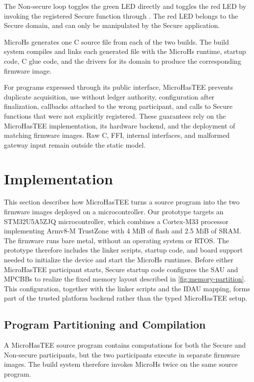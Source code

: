 \documentclass[sigconf]{acmart}
\begin{document}
The Non-secure loop toggles the green LED directly and toggles the red LED by invoking the registered Secure function through .
The red LED belongs to the Secure domain, and can only be manipulated by the Secure application.

MicroHs generates one C source file from each of the two builds.
The build system compiles and links each generated file with the MicroHs runtime, startup code, C glue code, and the drivers for its domain to produce the corresponding firmware image.

For programs expressed through its public interface, MicroHasTEE prevents duplicate acquisition, use without ledger authority, configuration after finalization, callbacks attached to the wrong participant, and calls to Secure functions that were not explicitly registered.
These guarantees rely on the MicroHasTEE implementation, its hardware backend, and the deployment of matching firmware images.
Raw C, FFI, internal interfaces, and malformed gateway input remain outside the static model.

\section{Implementation}
\label{sec:implementation}

This section describes how MicroHasTEE turns a source program into the two firmware images deployed on a microcontroller.
Our prototype targets an STM32U5A5ZJQ microcontroller, which combines a Cortex-M33 processor implementing Armv8-M TrustZone with 4 MiB of flash and 2.5 MiB of SRAM.
The firmware runs bare metal, without an operating system or RTOS.
The prototype therefore includes the linker scripts, startup code, and board support needed to initialize the device and start the MicroHs runtimes.
Before either MicroHasTEE participant starts, Secure startup code configures the SAU and MPCBBs to realize the fixed memory layout described in \cref{fig:memory-partition}.
This configuration, together with the linker scripts and the IDAU mapping, forms part of the trusted platform backend rather than the typed MicroHasTEE setup.

\subsection{Program Partitioning and Compilation}

A MicroHasTEE source program contains computations for both the Secure and Non-secure participants, but the two participants execute in separate firmware images.
The build system therefore invokes MicroHs twice on the same source program.
\end{document}
